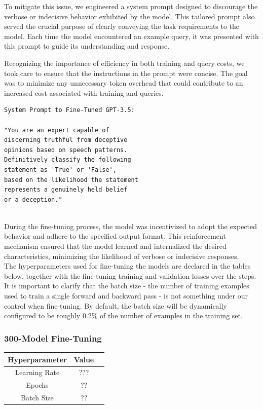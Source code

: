 \documentclass[10pt,twocolumn,letterpaper]{article}
\begin{document}
To mitigate this issue, we engineered a system prompt designed to 
discourage the verbose or indecisive behavior exhibited by the model. This tailored prompt also served
the crucial purpose of clearly conveying the task requirements to the model. Each time the model encountered 
an example query, it was presented with this prompt to guide its understanding and response.

Recognizing the importance of efficiency in both training and query costs, we took care to ensure that 
the instructions in the prompt were concise. The goal was to minimize any unnecessary token overhead that 
could contribute to an increased cost associated with training and queries.  \\

\begin{verbatim}
System Prompt to Fine-Tuned GPT-3.5:

"You are an expert capable of
discerning truthful from deceptive
opinions based on speech patterns. 
Definitively classify the following 
statement as 'True' or 'False', 
based on the likelihood the statement
represents a genuinely held belief 
or a deception."
\end{verbatim} \\

During the fine-tuning process, the model was incentivized to adopt the expected behavior and adhere to the specified output format. 
This reinforcement mechanism ensured that the model learned and internalized the desired characteristics, 
minimizing the likelihood of verbose or indecisive responses. \\

The hyperparameters used for fine-tuning the models are declared in 
the tables below, together with the fine-tuning training and validation losses over the steps.
It is important to clarify that the batch size - the number of training examples used to train a single forward and backward pass - is not something under our control when fine-tuning.
By default, the batch size will be dynamically configured to be roughly 0.2\% of the number of examples in the training set.


\subsubsection*{300-Model Fine-Tuning}


\begin{center}

    \begin{tabular}{ccc}
        \toprule
        Hyperparameter & Value \\
        \midrule
        Learning Rate & ??? \\
        Epochs & ?? \\
        Batch Size & ?? \\
        \bottomrule
    \end{tabular}
\end{center} 
\end{document}
